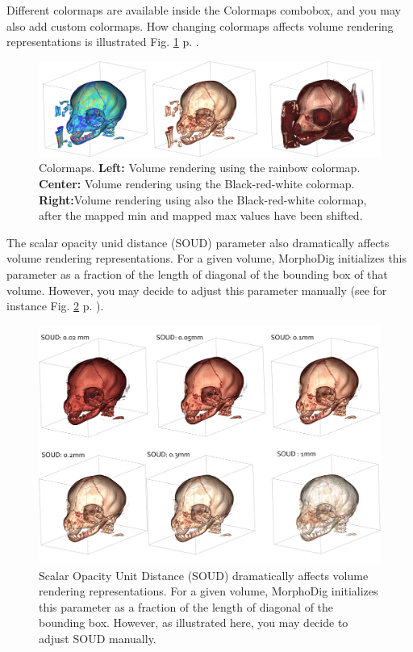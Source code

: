 Different colormaps are available inside the Colormaps combobox, and you may also add custom colormaps. How changing colormaps affects volume rendering representations is illustrated Fig. \ref{volume_colormap_example} p. \pageref{volume_colormap_example}.
\begin{figure}
  \centering
  \includegraphics[scale=0.2]{images/14/colormap_example/colormap_example.png}
\caption{Colormaps. \textbf{Left:} Volume rendering using the rainbow colormap. \textbf{Center:} Volume rendering using the Black-red-white colormap.  \textbf{Right:}Volume rendering using also the Black-red-white colormap, after the mapped min and mapped max values have been shifted.}	
\label{volume_colormap_example}
 \end{figure}

The scalar opacity unid distance (SOUD) parameter also dramatically affects volume rendering representations. For a given volume, MorphoDig initializes this parameter as a fraction of the length of diagonal of the bounding box of that volume. However, you may decide to adjust this parameter manually (see for instance Fig. \ref{soud_example} p. \pageref{soud_example}).
\begin{figure}
  \centering
  \includegraphics[scale=0.21]{images/14/soud/soud_example.png}
\caption{Scalar Opacity Unit Distance (SOUD) dramatically affects volume rendering representations. For a given volume, MorphoDig initializes this parameter as a fraction of the length of diagonal of the bounding box. However, as illustrated here, you may decide to adjust SOUD manually.}	 
\label{soud_example}
 \end{figure}


